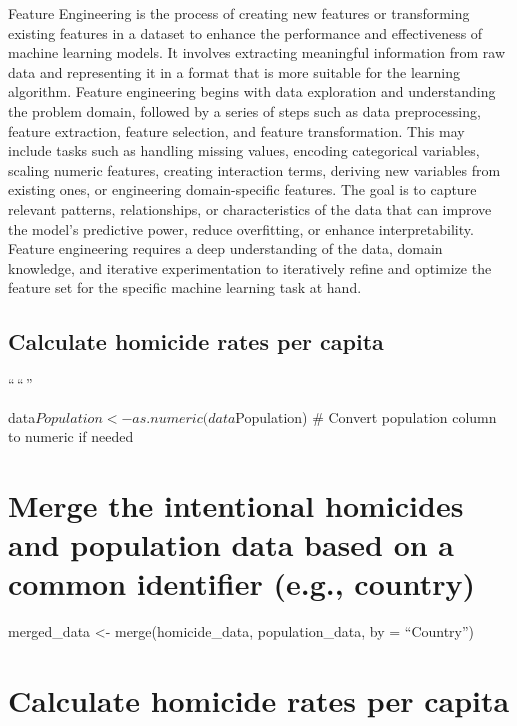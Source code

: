 \documentclass[
]{article}
\begin{document}
Feature Engineering is the process of creating new features or
transforming existing features in a dataset to enhance the performance
and effectiveness of machine learning models. It involves extracting
meaningful information from raw data and representing it in a format
that is more suitable for the learning algorithm. Feature engineering
begins with data exploration and understanding the problem domain,
followed by a series of steps such as data preprocessing, feature
extraction, feature selection, and feature transformation. This may
include tasks such as handling missing values, encoding categorical
variables, scaling numeric features, creating interaction terms,
deriving new variables from existing ones, or engineering
domain-specific features. The goal is to capture relevant patterns,
relationships, or characteristics of the data that can improve the
model's predictive power, reduce overfitting, or enhance
interpretability. Feature engineering requires a deep understanding of
the data, domain knowledge, and iterative experimentation to iteratively
refine and optimize the feature set for the specific machine learning
task at hand.

\hypertarget{calculate-homicide-rates-per-capita}{%
\subsection{Calculate homicide rates per
capita}\label{calculate-homicide-rates-per-capita}}

``\,``\,''

data\(Population <- as.numeric(data\)Population) \# Convert population
column to numeric if needed

\hypertarget{merge-the-intentional-homicides-and-population-data-based-on-a-common-identifier-e.g.-country}{%
\section{Merge the intentional homicides and population data based on a
common identifier (e.g.,
country)}\label{merge-the-intentional-homicides-and-population-data-based-on-a-common-identifier-e.g.-country}}

merged\_data \textless- merge(homicide\_data, population\_data, by =
``Country'')

\hypertarget{calculate-homicide-rates-per-capita-1}{%
\section{Calculate homicide rates per
capita}\label{calculate-homicide-rates-per-capita-1}}
\end{document}
